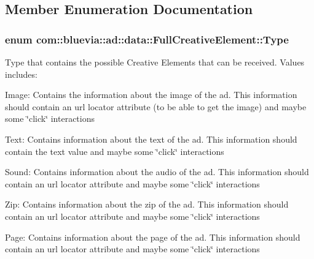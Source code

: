 \subsection{Member Enumeration Documentation}
\hypertarget{classcom_1_1bluevia_1_1ad_1_1data_1_1FullCreativeElement_a1a64b29ff50d01119bbaf6fee4e3f4f4}{
\subsubsection[{Type}]{\setlength{\rightskip}{0pt plus 5cm}enum {\bf com::bluevia::ad::data::FullCreativeElement::Type}}}
\label{classcom_1_1bluevia_1_1ad_1_1data_1_1FullCreativeElement_a1a64b29ff50d01119bbaf6fee4e3f4f4}
Type that contains the possible Creative Elements that can be received. Values includes: 
\begin{DoxyItemize}
\item Image: Contains the information about the image of the ad. This information should contain an url locator attribute (to be able to get the image) and maybe some \char`\"{}click\char`\"{} interactions  
\item Text: Contains information about the text of the ad. This information should contain the text value and maybe some \char`\"{}click\char`\"{} interactions  
\item Sound: Contains information about the audio of the ad. This information should contain an url locator attribute and maybe some \char`\"{}click\char`\"{} interactions  
\item Zip: Contains information about the zip of the ad. This information should contain an url locator attribute and maybe some \char`\"{}click\char`\"{} interactions  
\item Page: Contains information about the page of the ad. This information should contain an url locator attribute and maybe some \char`\"{}click\char`\"{} interactions  
\end{DoxyItemize}


